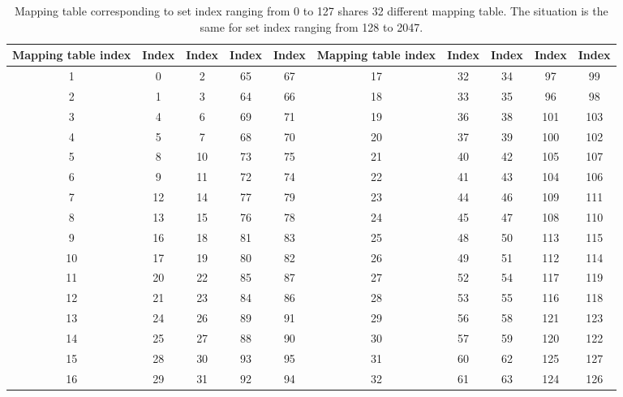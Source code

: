 \documentclass[conference]{IEEEtran}
\newcommand{\otoprule}{\midrule[\heavyrulewidth]}
\begin{document}
\begin{table*}[!htbp]
\centering
\caption{Mapping table corresponding to set index ranging from 0 to 127 shares 32 different mapping table. The situation is the same for set index ranging from 128 to 2047.}
\begin{tabular}{cccccccccc} 
	\toprule
	Mapping table index & Index & Index &  Index & Index & Mapping table index & Index & Index &  Index & Index    \\ \otoprule
 1   &   0   &  2    &   65  &   67 & 17  &   32  &  34   &   97  &   99 \\ \midrule    
 2   &   1   &  3    &   64  &   66 & 18  &   33  &  35   &   96  &   98 \\ \midrule
 3   &   4   &  6    &   69  &   71 & 19  &   36  &  38   &   101 &  103 \\ \midrule
 4   &   5   &  7    &   68  &   70 & 20  &   37  &  39   &   100 &  102 \\ \midrule
 5   &   8   &  10   &   73  &   75 & 21  &   40  &  42   &   105 &  107 \\ \midrule
 6   &   9   &  11   &   72  &   74 & 22  &   41  &  43   &   104 &  106 \\ \midrule
 7   &   12  &  14   &   77  &   79 & 23  &   44  &  46   &   109 &  111 \\ \midrule
 8   &   13  &  15   &   76  &   78 & 24  &   45  &  47   &   108 &  110 \\ \midrule
 9   &   16  &  18   &   81  &   83 & 25  &   48  &  50   &   113 &  115 \\ \midrule
 10  &   17  &  19   &   80  &   82 & 26  &   49  &  51   &   112 &  114 \\ \midrule
 11  &   20  &  22   &   85  &   87 & 27  &   52  &  54   &   117 &  119 \\ \midrule
 12  &   21  &  23   &   84  &   86 & 28  &   53  &  55   &   116 &  118 \\ \midrule
 13  &   24  &  26   &   89  &   91 & 29  &   56  &  58   &   121 &  123 \\ \midrule
 14  &   25  &  27   &   88  &   90 & 30  &   57  &  59   &   120 &  122 \\ \midrule
 15  &   28  &  30   &   93  &   95 & 31  &   60  &  62   &   125 &  127 \\ \midrule
 16  &   29  &  31   &   92  &   94 & 32  &   61  &  63   &   124 &  126 \\ 
\bottomrule
\end{tabular}
\label{tab:32MappingTable}
\end{table*}
\end{document}
